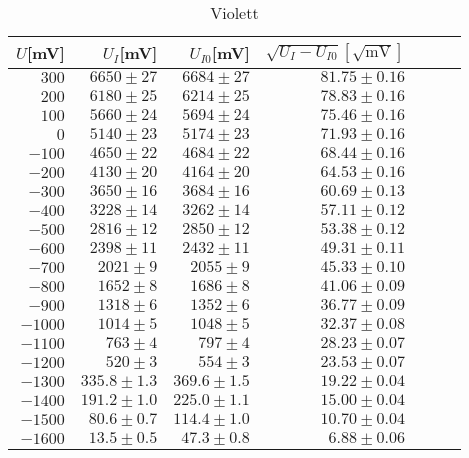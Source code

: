 \begin{table}[h!]
  \centering
  \caption{Violett}
    \begin{tabular}{r r r r r r r}
    \toprule
    $U$[mV] & $U_I$[mV] & $U_{I0}$[mV] & $\sqrt{U_I  - U_{I0}}[\sqrt{\text{mV}}]$\\
    \midrule
    $300 $  & $6650 \pm 27$ & $6684 \pm  27$ & $81.75 \pm  0.16$ \\
    $200$   &$ 6180 \pm 25$ &$ 6214 \pm  25$ & $78.83 \pm  0.16$ \\
    $100$   & $5660\pm  24$ & $5694 \pm  24$ & $75.46 \pm  0.16$ \\
    $0$     & $5140\pm  23$ & $5174 \pm  23$ & $71.93 \pm  0.16$ \\
    $-100$  & $4650 \pm  22$ & $4684 \pm 22$ &$ 68.44 \pm  0.16$\\
    $-200 $ & $4130\pm  20 $& $4164 \pm  20$ & $64.53 \pm  0.16$ \\
    $-300$  & $3650\pm  16$ & $3684 \pm  16$ & $60.69\pm  0.13 $\\
    $-400$  & $3228\pm  14$ & $3262 \pm  14$ &$ 57.11 \pm  0.12$ \\
   $ -500$  & $2816\pm  12$ & $2850 \pm  12$ & $53.38 \pm  0.12 $\\
    $-600$  & $2398\pm  11$ & $2432 \pm  11$ & $49.31 \pm  0.11$ \\
    $-700$  & $2021\pm  9$ & $2055 \pm  9$ & $45.33 \pm  0.10 $\\
    $-800$  & $1652\pm  8$ & $1686 \pm  8$ & $41.06 \pm  0.09$ \\
    $-900$  & $1318\pm  6$ & $1352 \pm  6$ & $36.77 \pm  0.09$ \\
    $-1000 $& $1014\pm  5$ & $1048 \pm  5$ & $32.37\pm  0.08$\\
    $-1100$ & $763\pm  4$ & $797 \pm  4$ & $28.23 \pm  0.07$ \\
   $ -1200$ & $520\pm  3$  & $554 \pm  3$ & $23.53 \pm  0.07$ \\
    $-1300$ & $335.8 \pm  1.3$ & $369.6 \pm  1.5$ & $19.22 \pm  0.04$ \\
    $-1400$ & $191.2 \pm  1.0$ & $225.0 \pm  1.1$& $15.00 \pm  0.04$ \\
    $-1500$ & $80.6  \pm  0.7$ & $114.4 \pm  1.0$ & $10.70 \pm  0.04$ \\
    $-1600$ & $13.5  \pm  0.5$ & $47.3  \pm  0.8 $&$ 6.88 \pm  0.06$\\
    \end{tabular}%
  \label{tab:addlabel}%
\end{table}%

